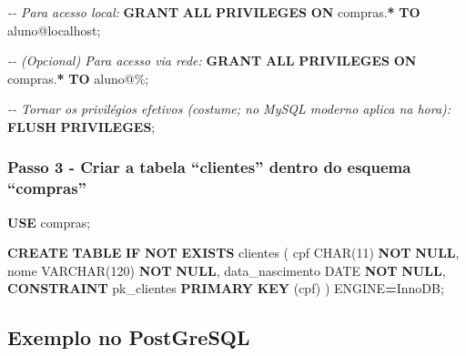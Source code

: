\documentclass[
]{book}
\newenvironment{Shaded}{\begin{snugshade}}{\end{snugshade}}
\newcommand{\CommentTok}[1]{\textcolor[rgb]{0.56,0.35,0.01}{\textit{#1}}}
\newcommand{\ControlFlowTok}[1]{\textcolor[rgb]{0.13,0.29,0.53}{\textbf{#1}}}
\newcommand{\DataTypeTok}[1]{\textcolor[rgb]{0.13,0.29,0.53}{#1}}
\newcommand{\DecValTok}[1]{\textcolor[rgb]{0.00,0.00,0.81}{#1}}
\newcommand{\KeywordTok}[1]{\textcolor[rgb]{0.13,0.29,0.53}{\textbf{#1}}}
\newcommand{\NormalTok}[1]{#1}
\newcommand{\OperatorTok}[1]{\textcolor[rgb]{0.81,0.36,0.00}{\textbf{#1}}}
\newcommand{\StringTok}[1]{\textcolor[rgb]{0.31,0.60,0.02}{#1}}
\begin{document}
\begin{Shaded}
\begin{Highlighting}[]
\CommentTok{{-}{-} Para acesso local:}
\KeywordTok{GRANT} \KeywordTok{ALL} \KeywordTok{PRIVILEGES} \KeywordTok{ON}\NormalTok{ compras.}\OperatorTok{*} \KeywordTok{TO} \StringTok{\textquotesingle{}aluno\textquotesingle{}}\NormalTok{@}\StringTok{\textquotesingle{}localhost\textquotesingle{}}\NormalTok{;}

\CommentTok{{-}{-} (Opcional) Para acesso via rede:}
\KeywordTok{GRANT} \KeywordTok{ALL} \KeywordTok{PRIVILEGES} \KeywordTok{ON}\NormalTok{ compras.}\OperatorTok{*} \KeywordTok{TO} \StringTok{\textquotesingle{}aluno\textquotesingle{}}\NormalTok{@}\StringTok{\textquotesingle{}\%\textquotesingle{}}\NormalTok{;}

\CommentTok{{-}{-} Tornar os privilégios efetivos (costume; no MySQL moderno aplica na hora):}
\KeywordTok{FLUSH} \KeywordTok{PRIVILEGES}\NormalTok{;}
\end{Highlighting}
\end{Shaded}

\subsubsection{Passo 3 - Criar a tabela ``clientes'' dentro do esquema ``compras''}\label{passo-3---criar-a-tabela-clientes-dentro-do-esquema-compras}

\begin{Shaded}
\begin{Highlighting}[]
\KeywordTok{USE}\NormalTok{ compras;}

\KeywordTok{CREATE} \KeywordTok{TABLE} \ControlFlowTok{IF} \KeywordTok{NOT} \KeywordTok{EXISTS}\NormalTok{ clientes (}
\NormalTok{  cpf            }\DataTypeTok{CHAR}\NormalTok{(}\DecValTok{11}\NormalTok{)     }\KeywordTok{NOT} \KeywordTok{NULL}\NormalTok{,}
\NormalTok{  nome           }\DataTypeTok{VARCHAR}\NormalTok{(}\DecValTok{120}\NormalTok{) }\KeywordTok{NOT} \KeywordTok{NULL}\NormalTok{,}
\NormalTok{  data\_nascimento }\DataTypeTok{DATE}        \KeywordTok{NOT} \KeywordTok{NULL}\NormalTok{,}
  \KeywordTok{CONSTRAINT}\NormalTok{ pk\_clientes }\KeywordTok{PRIMARY} \KeywordTok{KEY}\NormalTok{ (cpf)}
\NormalTok{) ENGINE}\OperatorTok{=}\NormalTok{InnoDB;}
\end{Highlighting}
\end{Shaded}

\subsection{Exemplo no PostGreSQL}\label{exemplo-no-postgresql}
\end{document}
